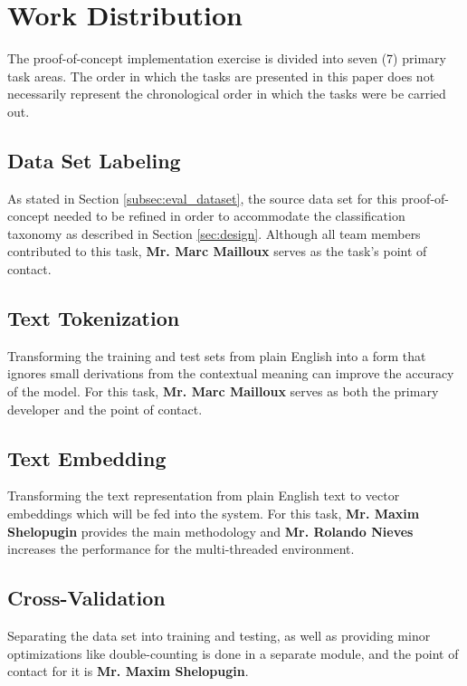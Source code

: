 \documentclass[conference]{sig-alternate-05-2015}
\begin{document}
\section{Work Distribution}\label{sec:plan_roles}
The proof-of-concept implementation exercise is divided into seven (7)
primary task areas. The order in which the tasks are presented in this paper
does not necessarily represent the chronological order in which the tasks were
be carried out.

\subsection{Data Set Labeling}\label{sec:labeling_task}
As stated in Section \ref{subsec:eval_dataset}, the source data set for this
proof-of-concept needed to be refined in order to accommodate the
classification taxonomy as described in Section \ref{sec:design}. Although all
team members contributed to this task, \textbf{Mr. Marc Mailloux} serves as the
task's point of contact.

\subsection{Text Tokenization}\label{sec:tokenization_task}
Transforming the training and test sets from plain English into a form that 
ignores small derivations from the contextual meaning can improve the accuracy
of the model. For this task, \textbf{Mr. Marc Mailloux} serves as both the primary 
developer and the point of contact. 

\subsection{Text Embedding}\label{sec:embedding_task}
Transforming the text representation from plain English text to vector embeddings
which will be fed into the system. For this task, \textbf{Mr. Maxim Shelopugin} 
provides the main methodology and \textbf{Mr. Rolando Nieves} increases the 
performance for the multi-threaded environment.

\subsection{Cross-Validation}\label{sec:validation_task}
Separating the data set into training and testing, as well as providing
minor optimizations like double-counting is done in a separate module, and the
point of contact for it is \textbf{Mr. Maxim Shelopugin}. 
\end{document}
